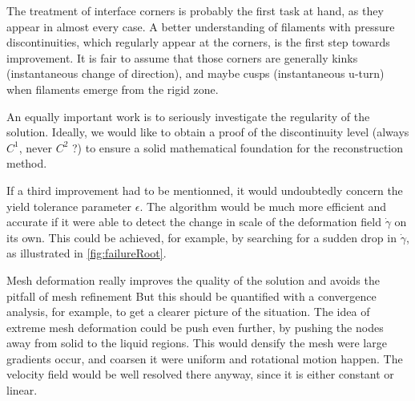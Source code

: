 \documentclass[11 pt]{report}
\begin{document}
The treatment of interface corners is probably the first task at hand, as they appear in almost every case. A better understanding of filaments with pressure discontinuities, which regularly appear at the corners, is the first step towards improvement. It is fair to assume that those corners are generally kinks (instantaneous change of direction), and maybe cusps (instantaneous u-turn) when filaments emerge from the rigid zone.

An equally important work is to seriously investigate the regularity of the solution. Ideally, we would like to obtain a proof of the discontinuity level (always $C^1$, never $C^2$ ?) to ensure a solid mathematical foundation for the reconstruction method.

If a third improvement had to be mentionned, it would undoubtedly concern the yield tolerance parameter $\epsilon$. The algorithm would be much more efficient and accurate if it were able to detect the change in scale of the deformation field $\dot \gamma$ on its own. This could be achieved, for example, by searching for a sudden drop in $\dot \gamma$, as illustrated in \cref{fig:failureRoot}.

Mesh deformation really improves the quality of the solution and avoids the pitfall of mesh refinement But this should be quantified with a convergence analysis, for example, to get a clearer picture of the situation. The idea of extreme mesh deformation could be push even further, by pushing the nodes away from solid to the liquid regions. This would densify the mesh were large gradients occur, and coarsen it were uniform and rotational motion happen. The velocity field would be well resolved there anyway, since it is either constant or linear.








\end{document}
